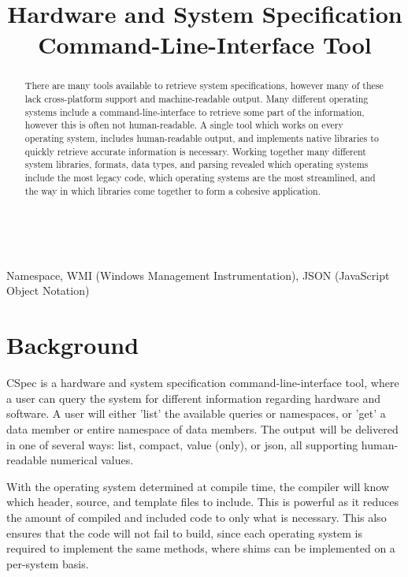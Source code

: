 \documentclass[conference]{IEEEtran}
\begin{document}
\title{Hardware and System Specification Command-Line-Interface Tool}
\author{
}
\maketitle

\begin{abstract}
There are many tools available to retrieve system specifications, however many of these lack cross-platform support and machine-readable output.
Many different operating systems include a command-line-interface to retrieve some part of the information, however this is often not human-readable.
A single tool which works on every operating system, includes human-readable output, and implements native libraries to quickly retrieve accurate information is necessary.
Working together many different system libraries, formats, data types, and parsing revealed which operating systems include the most legacy code, which operating systems are the most streamlined, and the way in which libraries come together to form a cohesive application.
\end{abstract}
~\\
\begin{IEEEkeywords}
Namespace, WMI (Windows Management Instrumentation), JSON (JavaScript Object Notation)
\end{IEEEkeywords}

\section{Background}
CSpec is a hardware and system specification command-line-interface tool, where a user can query
the system for different information regarding hardware and software.
A user will either 'list' the available queries or namespaces, or 'get' a data member or entire namespace of data members.
The output will be delivered in one of several ways: list, compact, value (only), or json, all supporting human-readable numerical values.

With the operating system determined at compile time, the compiler will know which header, source, and template files to include.
This is powerful as it reduces the amount of compiled and included code to only what is necessary.
This also ensures that the code will not fail to build, since each operating system is required to implement the same methods,
where shims can be implemented on a per-system basis.
\end{document}
